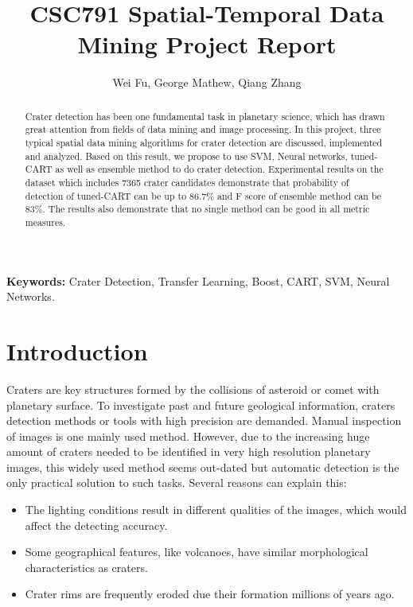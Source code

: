 \documentclass[conference]{IEEEtran}
\begin{document}
\title{CSC791 Spatial-Temporal Data Mining Project Report}
\author{Wei Fu, George Mathew, Qiang Zhang} 

\maketitle
\begin{abstract}
  Crater detection has been one fundamental task in planetary science, which has drawn great attention from fields of data mining and image processing. In this project, three typical spatial data mining algorithms for crater detection are discussed, implemented and analyzed. Based on this result, we propose to use SVM, Neural
networks, tuned-CART as well as ensemble method to do crater detection. Experimental results on the dataset which includes 7365 crater candidates demonstrate that probability of detection of tuned-CART can be up to 86.7\% and F score of ensemble method can be 83\%. The results also demonstrate that no single method can be good in all metric measures.
\end{abstract}

{\bf Keywords:} Crater Detection, Transfer Learning, Boost, CART, SVM, Neural Networks.

\section{Introduction}
Craters are key structures formed by the collisions of asteroid or comet with planetary surface. To investigate past and future geological information, craters detection methods or tools with high precision are demanded. Manual inspection of images is one mainly used method. However, due to the increasing huge amount of craters needed to be identified in very high resolution planetary images, this widely used method seems out-dated but automatic detection is the only practical solution to such tasks. Several reasons \cite{kim2005automated} can explain this:
\begin{itemize}
 \item The lighting conditions result in different qualities of the images, which would affect the detecting accuracy.
 \item Some geographical features, like volcanoes, have similar morphological characteristics as craters.
 \item Crater rims are frequently eroded due their formation millions of years ago. 
\end{itemize}
\end{document}
